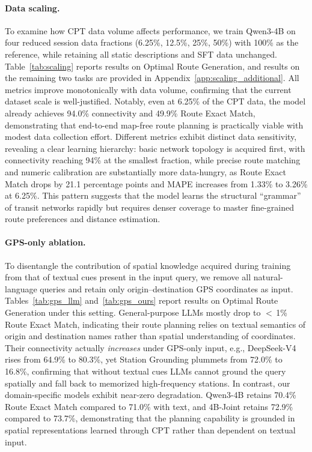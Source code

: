 \documentclass{llmxive}
\begin{document}
\paragraph{Data scaling.}
To examine how CPT data volume affects performance, we train Qwen3-4B on four reduced session data fractions (6.25\%, 12.5\%, 25\%, 50\%) with 100\% as the reference, while retaining all static descriptions and SFT data unchanged. Table~\ref{tab:scaling} reports results on Optimal Route Generation, and results on the remaining two tasks are provided in Appendix~\ref{app:scaling_additional}. All metrics improve monotonically with data volume, confirming that the current dataset scale is well-justified. Notably, even at 6.25\% of the CPT data, the model already achieves 94.0\% connectivity and 49.9\% Route Exact Match, demonstrating that end-to-end map-free route planning is practically viable with modest data collection effort. Different metrics exhibit distinct data sensitivity, revealing a clear learning hierarchy: basic network topology is acquired first, with connectivity reaching 94\% at the smallest fraction, while precise route matching and numeric calibration are substantially more data-hungry, as Route Exact Match drops by 21.1 percentage points and MAPE increases from 1.33\% to 3.26\% at 6.25\%. This pattern suggests that the model learns the structural ``grammar'' of transit networks rapidly but requires denser coverage to master fine-grained route preferences and distance estimation.

\paragraph{GPS-only ablation.}
To disentangle the contribution of spatial knowledge acquired during training from that of textual cues present in the input query, we remove all natural-language queries and retain only origin--destination GPS coordinates as input. Tables~\ref{tab:gps_llm} and~\ref{tab:gps_ours} report results on Optimal Route Generation under this setting. General-purpose LLMs mostly drop to $<$\,1\% Route Exact Match, indicating their route planning relies on textual semantics of origin and destination names rather than spatial understanding of coordinates. Their connectivity actually \emph{increases} under GPS-only input, e.g., DeepSeek-V4 rises from 64.9\% to 80.3\%, yet Station Grounding plummets from 72.0\% to 16.8\%, confirming that without textual cues LLMs cannot ground the query spatially and fall back to memorized high-frequency stations. In contrast, our domain-specific models exhibit near-zero degradation. Qwen3-4B retains 70.4\% Route Exact Match compared to 71.0\% with text, and 4B-Joint retains 72.9\% compared to 73.7\%, demonstrating that the planning capability is grounded in spatial representations learned through CPT rather than dependent on textual input.
\end{document}
